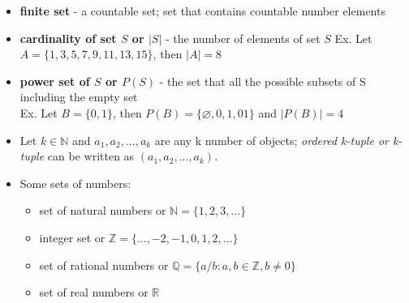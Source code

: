 \begin{itemize}
 \item \textbf{finite set} - a countable set; set that contains countable number elements
 \item  \textbf{cardinality of set $S$ or $|S|$} - the number of elements of set $S$
 Ex. Let $A=\{1,3,5,7,9,11,13,15\}$, then $|A|=8$
 \item \textbf{power set of $S$ or $P(S)$} - the set that all the possible subsets of S including the empty set\\
 Ex. Let $B=\{0,1\}$, then $P(B)=\{\varnothing,0,1,01\}$ and $|P(B)|=4$
 \item Let $k \in \mathbb{N}$ and $a_1,a_2,...,a_k$ are any k number of objects; \textit{ordered k-tuple or k-tuple} can be written as $(a_1,a_2,...,a_k)$.
 \item Some sets of numbers:
 \begin{itemize}
 	\item set of natural numbers or $\mathbb{N} = \{1,2,3,...\}$
 	\item integer set or $\mathbb{Z} = \{...,-2,-1,0,1,2,...\}$
 	\item set of rational numbers or $\mathbb{Q} = \{a/b:a,b \in \mathbb{Z},b\neq 0 \}$
 	\item set of real numbers or $\mathbb{R}$
 \end{itemize}
\end{itemize}

